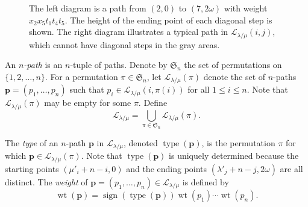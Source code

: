 \documentclass{amsart}
\numberwithin{equation}{section}
\theoremstyle{definition}
\newcommand\type{\operatorname{type}}
\newcommand\Sym{\mathfrak{S}}
\newcommand\LL{\mathcal{L}_\lm}
\newcommand\pp{\mathbf{p}}
\newcommand\sign{\operatorname{sign}}
\newcommand\lm{{\lambda/\mu}}
\newcommand\wt{\operatorname{wt}}
\newcommand\RSEgridonly[3]{
  \def\X{#1} \def\Y{#2} \def\W{#3}
  \foreach \i in {0,...,\X}
  {
    \draw[gray,very thin] (\i,0) -- (\i,\Y+\W+4);
  }
  \pgfmathsetmacro{\y}{\W+1}
  \pgfmathsetmacro{\z}{\W}
  \pgfmathsetmacro{\m}{\Y}
  \foreach \y in {0,...,\m}
  {
    \draw[gray,very thin] (0,\y) -- (\X,\y);
  }
  \pgfmathsetmacro{\m}{\W+2}
  \foreach \y in {2,...,\m}
  {
    \draw[gray,very thin] (0,\Y+\y) -- (\X,\Y+\y);
  }
  \draw[gray,very thin] (0,\Y+\W+4) -- (\X,\Y+\W+4);
}
\newcommand\RSEgrid[3]{
  \RSEgridonly{#1}{#2}{#3}
  \def\X{#1} \def\Y{#2} \def\W{#3}
  \node [left] at (0,\Y+2) {$\omega$};
  \node [left] at (0,\Y+\W+4) {$2\omega$};
  \node [left] at (0,\Y+1.3) {$\vdots$};
  \node [left] at (0,\Y+\W+3.3) {$\vdots$};
  \foreach \j in {0,...,\Y}
  {
    \node [left] at (0,\j) {\j};
  }
  \pgfmathsetmacro{\y}{\W+1}
  \pgfmathsetmacro{\z}{\W}
  \foreach \j in {1,...,\z}
  {
    \node [left] at (0,\Y+2+\j) {$\omega$+\j};
  }
}
\begin{document}
\begin{figure}
  \centering
{}\qquad\qquad
{}
\caption{The left diagram is a path from $(2,0)$ to $(7,2\omega)$ with weight
  $x_2x_5t_1t_4t_5$. The height of the ending point of each diagonal step is
  shown. The right diagram illustrates a typical path in $\LL(i,j)$, which
  cannot have diagonal steps in the gray areas.}
  \label{fig:L(i,j)}
\end{figure}

An \emph{$n$-path} is an $n$-tuple of paths. Denote by $\Sym_n$ the set of
permutations on $\{1,2,\dots,n\}$. For a permutation $\pi\in\mathfrak{S}_n$, let
$\LL(\pi)$ denote the set of $n$-paths $\pp= (p_1,\dots,p_n)$ such that $p_i\in
\LL(i,\pi(i))$ for all $1\le i\le n$. Note that $\LL(\pi)$ may be
empty for some $\pi$. Define
\[
\LL=\bigcup_{\pi\in \mathfrak{S}_n}\LL(\pi).
\]

The \emph{type} of an $n$-path $\pp$ in $\LL$, denoted $\type(\pp)$, is the
permutation $\pi$ for which $\pp\in\LL(\pi)$. Note that $\type(\pp)$ is uniquely
determined because the starting points $(\mu'_i+n-i,0)$ and the ending points
$(\lambda'_j+n-j,2\omega)$ are all distinct. The \emph{weight} of $\pp=
(p_1,\dots,p_n)\in \LL$ is defined by
\[
  \wt(\pp)=\sign(\type(\pp))\wt(p_1)\cdots\wt(p_n).
\]
\end{document}
